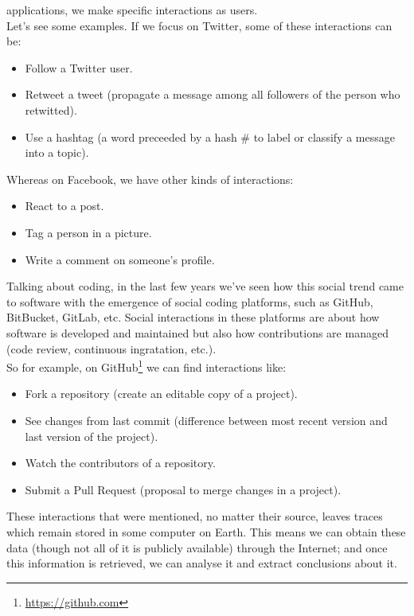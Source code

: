 \documentclass[a4paper, 12pt]{book}
\begin{document}
applications, we make specific interactions as users. \\
Let's see some examples. If we focus on Twitter, some of these interactions can be:
\begin{itemize}
    \item Follow a Twitter user.
    \item Retweet a tweet (propagate a message among all followers of the person who retwitted).
    \item Use a hashtag (a word preceeded by a hash \# to label or classify a message into a topic).
\end{itemize}
Whereas on Facebook, we have other kinds of interactions:
\begin{itemize}
    \item React to a post.
    \item Tag a person in a picture.
    \item Write a comment on someone's profile.
\end{itemize}
Talking about coding, in the last few years we've seen how this social trend came to software with the
emergence of social coding platforms, such as GitHub, BitBucket, GitLab, etc. Social interactions in these platforms are about how
software is developed and maintained but also how contributions are managed (code review, continuous ingratation, etc.).\\
So for example, on GitHub\footnote{\url{https://github.com}} we can find interactions like:
\begin{itemize}
    \item Fork a repository (create an editable copy of a project).
    \item See changes from last commit (difference between most recent version and last version of the project).
    \item Watch the contributors of a repository.
    \item Submit a Pull Request (proposal to merge changes in a project).
\end{itemize}
These interactions that were mentioned, no matter their source, leaves traces which remain stored in some computer on Earth.
This means we can obtain these data (though not all of it is publicly available) through the Internet;
and once this information is retrieved, we can analyse it and extract conclusions about it.
\end{document}
